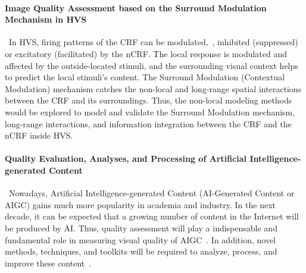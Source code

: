 \paragraph{Image Quality Assessment based on the Surround Modulation Mechanism in HVS}~In HVS, firing patterns of the CRF can be modulated,~\ie, inhibited (suppressed) or excitatory (facilitated) by the nCRF. The local response is modulated and affected by the outside-located stimuli, and the surrounding visual context helps to predict the local stimuli's content. The Surround Modulation (Contextual Modulation) mechanism catches the non-local and long-range spatial interactions between the CRF and its surroundings. Thus, the non-local modeling methods would be explored to model and validate the Surround Modulation mechanism, long-range interactions, and information integration between the CRF and the nCRF inside HVS.

\paragraph{Quality Evaluation, Analyses, and Processing of Artificial Intelligence-generated Content}~Nowadays, Artificial Intelligence-generated Content (AI-Generated Content or AIGC) gains much more popularity in academia and industry. In the next decade, it can be expected that a growing number of content in the Internet will be produced by AI. Thus, quality assessment will play a indispensable and fundamental role in measuring visual quality of AIGC~\citep{zhang2023perceptual}. In addition, novel methods, techniques, and toolkits will be required to analyze, process, and improve these content~\citep{wu2023ai}.
